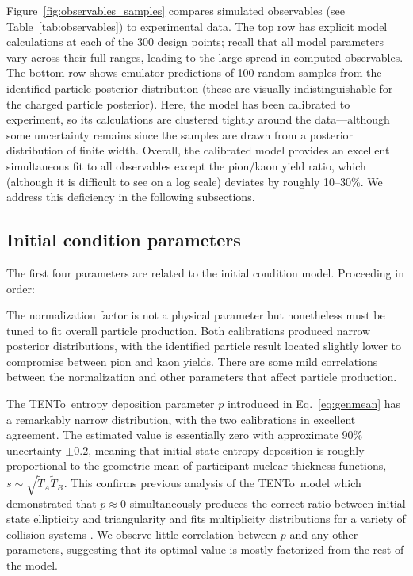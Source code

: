 \documentclass[aps,prc,reprint,amsmath,nofootinbib]{revtex4-1}
\newcommand{\trento}{T\raisebox{-0.5ex}{R}ENTo}
\newcommand{\T}{\tilde{T}}
\begin{document}
Figure~\ref{fig:observables_samples} compares simulated observables (see Table~\ref{tab:observables}) to experimental data.
The top row has explicit model calculations at each of the 300 design points;
recall that all model parameters vary across their full ranges, leading to the large spread in computed observables.
The bottom row shows emulator predictions of 100 random samples from the identified particle posterior distribution (these are visually indistinguishable for the charged particle posterior).
Here, the model has been calibrated to experiment, so its calculations are clustered tightly around the data---although some uncertainty remains since the samples are drawn from a posterior distribution of finite width.
Overall, the calibrated model provides an excellent simultaneous fit to all observables except the pion/kaon yield ratio, which (although it is difficult to see on a log scale) deviates by roughly 10--30\%.
We address this deficiency in the following subsections.


\subsection{Initial condition parameters}

The first four parameters are related to the initial condition model.
Proceeding in order:

The normalization factor is not a physical parameter but nonetheless must be tuned to fit overall particle production.
Both calibrations produced narrow posterior distributions, with the identified particle result located slightly lower to compromise between pion and kaon yields.
There are some mild correlations between the normalization and other parameters that affect particle production.

The \trento\ entropy deposition parameter $p$ introduced in Eq.~\eqref{eq:genmean} has a remarkably narrow distribution, with the two calibrations in excellent agreement.
The estimated value is essentially zero with approximate 90\% uncertainty $\pm0.2$, meaning that initial state entropy deposition is roughly proportional to the geometric mean of participant nuclear thickness functions, $s \sim \sqrt{\T_A\T_B}$.
This confirms previous analysis of the \trento\ model which demonstrated that $p \approx 0$ simultaneously produces the correct ratio between initial state ellipticity and triangularity and fits multiplicity distributions for a variety of collision systems \cite{Moreland:2014oya}.
We observe little correlation between $p$ and any other parameters, suggesting that its optimal value is mostly factorized from the rest of the model.
\end{document}
